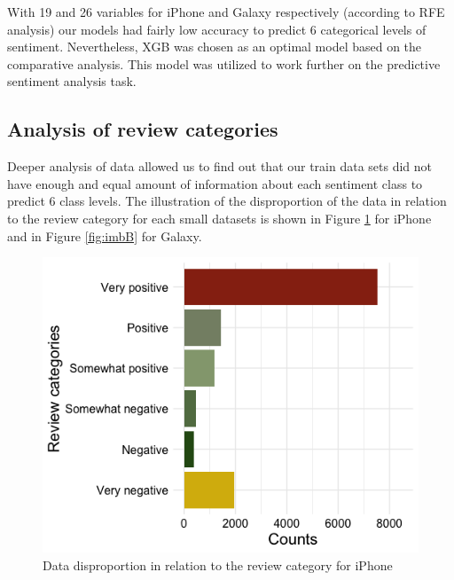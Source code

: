 \documentclass[12]{article}
\begin{document}
With 19 and 26 variables for iPhone and Galaxy respectively (according to RFE analysis) our models had fairly low accuracy to predict 6 categorical levels of sentiment. Nevertheless, XGB was chosen as an optimal model based on the comparative analysis. This model was utilized to work further on the predictive sentiment analysis task.
\newpage
\subsection{Analysis of review categories}
Deeper analysis of data allowed us to find out that our train data sets did not have enough and equal amount of information about each sentiment class to predict 6 class levels. The illustration of the disproportion of the data in relation to the review category for each small datasets is shown in Figure \ref{fig:imbA} for iPhone and in Figure \ref{fig:imbB} for Galaxy. 

\begin{figure}[H]
\centering
\includegraphics[scale=0.5]{imbA.png}
\centering
\caption{Data disproportion in relation to the review category for iPhone}
\label{fig:imbA}
\end{figure}
\end{document}
